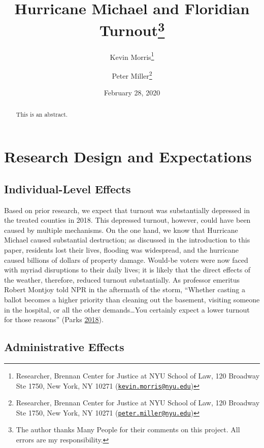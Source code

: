 \documentclass[
  12pt,
]{article}
\title{Hurricane Michael and Floridian Turnout\thanks{The author thanks Many People for their comments on this project. All errors are my responsibility.}}
\author{Kevin Morris\footnote{Researcher, Brennan Center for Justice at NYU School of Law, 120 Broadway Ste 1750, New York, NY 10271 (\href{mailto:kevin.morris@nyu.edu}{\nolinkurl{kevin.morris@nyu.edu}})} \and Peter Miller\footnote{Researcher, Brennan Center for Justice at NYU School of Law, 120 Broadway Ste 1750, New York, NY 10271 (\href{mailto:peter.miller@nyu.edu}{\nolinkurl{peter.miller@nyu.edu}})}}
\date{February 28, 2020}
\begin{document}
\maketitle
\begin{abstract}
This is an abstract.
\end{abstract}

\pagebreak

\doublespacing

\hypertarget{research-design-and-expectations}{%
\section*{Research Design and Expectations}\label{research-design-and-expectations}}

\hypertarget{individual-level-effects}{%
\subsection*{Individual-Level Effects}\label{individual-level-effects}}

Based on prior research, we expect that turnout was substantially depressed in the treated counties in 2018. This depressed turnout, however, could have been caused by multiple mechanisms. On the one hand, we know that Hurricane Michael caused substantial destruction; as discussed in the introduction to this paper, residents lost their lives, flooding was widespread, and the hurricane caused billions of dollars of property damage. Would-be voters were now faced with myriad disruptions to their daily lives; it is likely that the direct effects of the weather, therefore, reduced turnout substantially. As professor emeritus Robert Montjoy told NPR in the aftermath of the storm, ``Whether casting a ballot becomes a higher priority than cleaning out the basement, visiting someone in the hospital, or all the other demands\ldots You certainly expect a lower turnout for those reasons'' (Parks \protect\hyperlink{ref-Parks2018}{2018}).

\hypertarget{administrative-effects}{%
\subsection*{Administrative Effects}\label{administrative-effects}}
\end{document}
